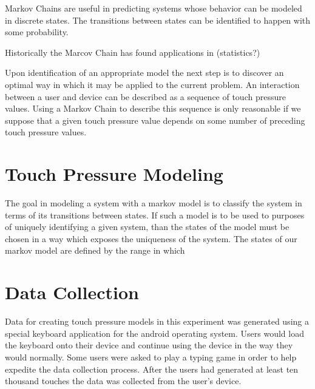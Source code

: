 \documentclass{acm_proc_article-sp}
\begin{document}
Markov Chains are useful in predicting systems whose behavior can be modeled in discrete states. The transitions between states can be identified to happen with some probability.

Historically the Marcov Chain has found applications in (statistics?)

Upon identification of an appropriate model the next step is to discover an optimal way in which it may be applied to the current problem. An interaction between a user and device can be described as a sequence of touch pressure values. Using a Markov Chain to describe this sequence is only reasonable if we suppose that a given touch pressure value depends on some number of preceding touch pressure values. \cite{marcov_chains_previous_n_values}
%

\section{Touch Pressure Modeling}
\label{touch_pressure_modeling}
%
The goal in modeling a system with a markov model is to classify the system in terms of its transitions between states. If such a model is to be used to purposes of uniquely identifying a given system, than the states of the model must be chosen in a way which exposes the uniqueness of the system.
The states of our markov model are defined by the range in which

\section{Data Collection}
\label{sec:data_collection}
Data for creating touch pressure models in this experiment was generated using a special keyboard application for the android operating system. Users would load the keyboard onto their device and continue using the device in the way they would normally. Some users were asked to play a typing game in order to help expedite the data collection process. After the users had generated at least ten thousand touches the data was collected from the user's device.
\end{document}
